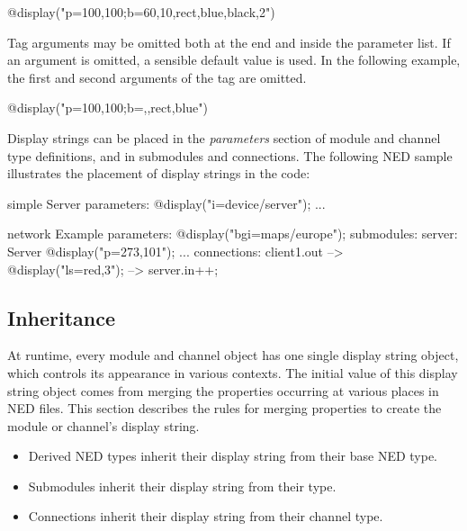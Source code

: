 \begin{ned}
@display("p=100,100;b=60,10,rect,blue,black,2")
\end{ned}

Tag arguments may be omitted both at the end and inside the parameter list.
If an argument is omitted, a sensible default value is used. In the following
example, the first and second arguments of the  tag are omitted.

\begin{ned}
@display("p=100,100;b=,,rect,blue")
\end{ned}

Display strings can be placed in the \textit{parameters} section of module
and channel type definitions, and in submodules and connections. The
following NED sample illustrates the placement of display strings in the
code:

\begin{ned}
simple Server
{
    parameters:
        @display("i=device/server");
    ...
}

network Example
{
    parameters:
        @display("bgi=maps/europe");
    submodules:
        server: Server {
            @display("p=273,101");
        }
        ...
    connections:
        client1.out --> { @display("ls=red,3"); } --> server.in++;
}
\end{ned}


\subsection{Inheritance}
\label{sec:graphics:displaystring-inheritance}

At runtime, every module and channel object has one single display string object,
which controls its appearance in various contexts. The initial value of
this display string object comes from merging the 
properties occurring at various places in NED files.
This section describes the rules for merging  properties
to create the module or channel's display string.

\begin{itemize}
  \item Derived NED types inherit their display string from their base NED type.
  \item Submodules inherit their display string from their type.
  \item Connections inherit their display string from their channel type.
\end{itemize}

